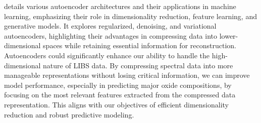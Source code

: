 \citet{bankAutoencoders2021} details various autoencoder architectures and their applications in machine learning, emphasizing their role in dimensionality reduction, feature learning, and generative models.
It explores regularized, denoising, and variational autoencoders, highlighting their advantages in compressing data into lower-dimensional spaces while retaining essential information for reconstruction.
Autoencoders could significantly enhance our ability to handle the high-dimensional nature of LIBS data.
By compressing spectral data into more manageable representations without losing critical information, we can improve model performance, especially in predicting major oxide compositions, by focusing on the most relevant features extracted from the compressed data representation.
This aligns with our objectives of efficient dimensionality reduction and robust predictive modeling.
